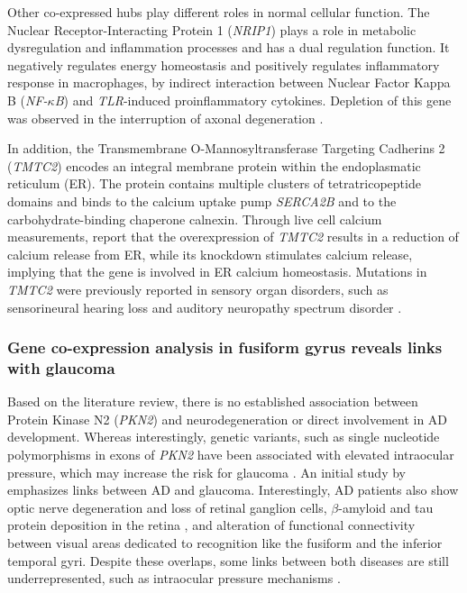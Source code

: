 \documentclass[utf8]{FrontiersinHarvard} %
\begin{document}
Other co-expressed hubs play different roles in normal cellular function. The Nuclear Receptor-Interacting Protein 1 (\textit{NRIP1}) plays a role in metabolic dysregulation and inflammation processes and has a dual regulation function. It negatively regulates energy homeostasis and positively regulates inflammatory response in macrophages, by indirect interaction between Nuclear Factor Kappa B (\textit{NF-$\kappa$B}) and \textit{TLR}-induced proinflammatory cytokines. Depletion of this gene was observed in the interruption of axonal degeneration \citep{ranea2022modulation}.

In addition, the Transmembrane O-Mannosyltransferase Targeting Cadherins 2 (\textit{TMTC2}) encodes an integral membrane protein within the endoplasmatic reticulum (ER). The protein contains multiple clusters of tetratricopeptide domains and binds to the calcium uptake pump \textit{SERCA2B} and to the carbohydrate-binding chaperone calnexin. Through live cell calcium measurements, \citet{sunryd2014tmtc1} report that the overexpression of \textit{TMTC2} results in a reduction of calcium release from ER, while its knockdown stimulates calcium release, implying that the gene is involved in ER calcium homeostasis. Mutations in \textit{TMTC2} were previously reported in sensory organ disorders, such as sensorineural hearing loss and auditory neuropathy spectrum disorder \citep{guillen2018tmtc2}.

\subsubsection{Gene co-expression analysis in fusiform gyrus reveals links with glaucoma}

Based on the literature review, there is no established association between Protein Kinase N2 (\textit{PKN2}) and neurodegeneration or direct involvement in AD development. Whereas interestingly, genetic variants, such as single nucleotide polymorphisms in exons of \textit{PKN2} have been associated with elevated intraocular pressure, which may increase the risk for glaucoma \citep{Gao2018}. An initial study by \citep{Wostyn1557} emphasizes links between AD and glaucoma. Interestingly, AD patients also show optic nerve degeneration and loss of retinal ganglion cells, $\beta$-amyloid and tau protein deposition in the retina \cite{Wostyn1557, ramirez2017role}, and alteration of functional connectivity between visual areas dedicated to recognition like the fusiform and the inferior temporal gyri. Despite these overlaps, some links between both diseases are still underrepresented, such as intraocular pressure mechanisms \citep{sen2020neurodegeneration}.
\end{document}
